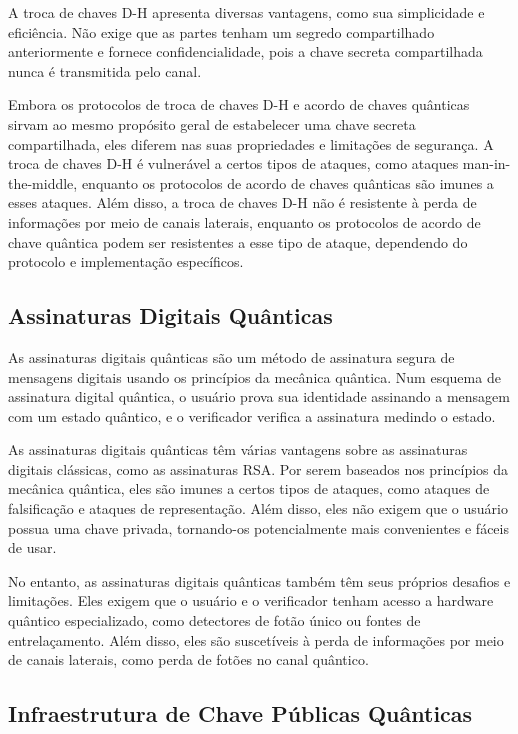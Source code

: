 A troca de chaves D-H apresenta diversas vantagens, como sua simplicidade e eficiência. Não exige que as partes tenham um segredo compartilhado anteriormente e fornece confidencialidade, pois a chave secreta compartilhada nunca é transmitida pelo canal.

Embora os protocolos de troca de chaves D-H e acordo de chaves quânticas sirvam ao mesmo propósito geral de estabelecer uma chave secreta compartilhada, eles diferem nas suas propriedades e limitações de segurança. A troca de chaves D-H é vulnerável a certos tipos de ataques, como ataques man-in-the-middle, enquanto os protocolos de acordo de chaves quânticas são imunes a esses ataques. Além disso, a troca de chaves D-H não é resistente à perda de informações por meio de canais laterais, enquanto os protocolos de acordo de chave quântica podem ser resistentes a esse tipo de ataque, dependendo do protocolo e implementação específicos.

\subsection{Assinaturas Digitais Quânticas}

As assinaturas digitais quânticas são um método de assinatura segura de mensagens digitais usando os princípios da mecânica quântica. Num esquema de assinatura digital quântica, o usuário prova sua identidade assinando a mensagem com um estado quântico, e o verificador verifica a assinatura medindo o estado.

As assinaturas digitais quânticas têm várias vantagens sobre as assinaturas digitais clássicas, como as assinaturas RSA. Por serem baseados nos princípios da mecânica quântica, eles são imunes a certos tipos de ataques, como ataques de falsificação e ataques de representação. Além disso, eles não exigem que o usuário possua uma chave privada, tornando-os potencialmente mais convenientes e fáceis de usar.

No entanto, as assinaturas digitais quânticas também têm seus próprios desafios e limitações. Eles exigem que o usuário e o verificador tenham acesso a hardware quântico especializado, como detectores de fotão único ou fontes de entrelaçamento. Além disso, eles são suscetíveis à perda de informações por meio de canais laterais, como perda de fotões no canal quântico.

\subsection{Infraestrutura de Chave Públicas Quânticas}

